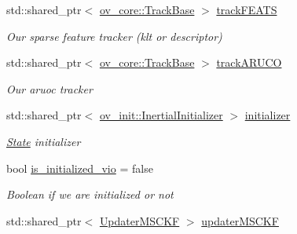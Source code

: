 \begin{DoxyCompactItemize}
\mbox{\label{classov__msckf_1_1VioManager_a3f464a59a277fef9c5d7f29202561c9c}} 
std\+::shared\+\_\+ptr$<$ \hyperlink{classov__core_1_1TrackBase}{ov\+\_\+core\+::\+Track\+Base} $>$ \hyperlink{classov__msckf_1_1VioManager_a3f464a59a277fef9c5d7f29202561c9c}{track\+F\+E\+A\+TS}
\begin{DoxyCompactList}\small\item\em Our sparse feature tracker (klt or descriptor) \end{DoxyCompactList}\item 
\mbox{\label{classov__msckf_1_1VioManager_a534feb840d93f24dfd0171b86d996a51}} 
std\+::shared\+\_\+ptr$<$ \hyperlink{classov__core_1_1TrackBase}{ov\+\_\+core\+::\+Track\+Base} $>$ \hyperlink{classov__msckf_1_1VioManager_a534feb840d93f24dfd0171b86d996a51}{track\+A\+R\+U\+CO}
\begin{DoxyCompactList}\small\item\em Our aruoc tracker \end{DoxyCompactList}\item 
\mbox{\label{classov__msckf_1_1VioManager_a9a29e966de741d42411c4c6c5ed2fea1}} 
std\+::shared\+\_\+ptr$<$ \hyperlink{classov__init_1_1InertialInitializer}{ov\+\_\+init\+::\+Inertial\+Initializer} $>$ \hyperlink{classov__msckf_1_1VioManager_a9a29e966de741d42411c4c6c5ed2fea1}{initializer}
\begin{DoxyCompactList}\small\item\em \hyperlink{classov__msckf_1_1State}{State} initializer \end{DoxyCompactList}\item 
\mbox{\label{classov__msckf_1_1VioManager_af39939911eb700d326389255b75738c9}} 
bool \hyperlink{classov__msckf_1_1VioManager_af39939911eb700d326389255b75738c9}{is\+\_\+initialized\+\_\+vio} = false
\begin{DoxyCompactList}\small\item\em Boolean if we are initialized or not \end{DoxyCompactList}\item 
\mbox{\label{classov__msckf_1_1VioManager_a9a12150c9f5297c07e82ae1a19539767}} 
std\+::shared\+\_\+ptr$<$ \hyperlink{classov__msckf_1_1UpdaterMSCKF}{Updater\+M\+S\+C\+KF} $>$ \hyperlink{classov__msckf_1_1VioManager_a9a12150c9f5297c07e82ae1a19539767}{updater\+M\+S\+C\+KF}

\end{DoxyCompactItemize}
